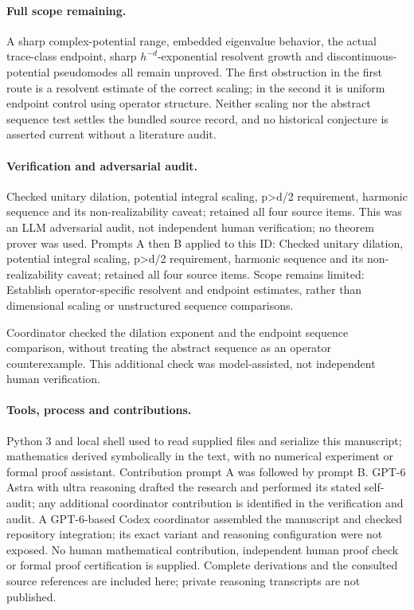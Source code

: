 \documentclass[11pt]{article}
\begin{document}
\paragraph{Full scope remaining.}A sharp complex-potential range, embedded eigenvalue behavior, the actual trace-class endpoint, sharp \(h^{-d}\)-exponential resolvent growth and discontinuous-potential pseudomodes all remain unproved. The first obstruction in the first route is a resolvent estimate of the correct scaling; in the second it is uniform endpoint control using operator structure. Neither scaling nor the abstract sequence test settles the bundled source record, and no historical conjecture is asserted current without a literature audit.

\paragraph{Verification and adversarial audit.}
Checked unitary dilation, potential integral scaling, p>d/2 requirement, harmonic sequence and its non-realizability caveat; retained all four source items. This was an LLM adversarial audit, not independent human verification; no theorem prover was used. Prompts A then B applied to this ID: Checked unitary dilation, potential integral scaling, p>d/2 requirement, harmonic sequence and its non-realizability caveat; retained all four source items. Scope remains limited: Establish operator-specific resolvent and endpoint estimates, rather than dimensional scaling or unstructured sequence comparisons.

Coordinator checked the dilation exponent and the endpoint sequence comparison, without treating the abstract sequence as an operator counterexample. This additional check was model-assisted, not independent human verification.

\paragraph{Tools, process and contributions.}
Python 3 and local shell used to read supplied files and serialize this manuscript; mathematics derived symbolically in the text, with no numerical experiment or formal proof assistant. Contribution prompt A was followed by prompt B. GPT-6 Astra with ultra reasoning drafted the research and performed its stated self-audit; any additional coordinator contribution is identified in the verification and audit. A GPT-6-based Codex coordinator assembled the manuscript and checked repository integration; its exact variant and reasoning configuration were not exposed. No human mathematical contribution, independent human proof check or formal proof certification is supplied. Complete derivations and the consulted source references are included here; private reasoning transcripts are not published.
\end{document}
